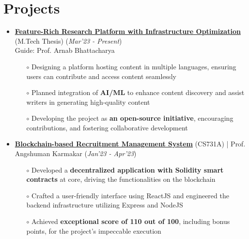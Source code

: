 \documentclass[10.8pt, a4paper]{extarticle}
\newcommand{\shorterSection}[1]{\vspace{-10pt}\section{#1}}
\begin{document}
\shorterSection{Projects}
\vspace{-2pt}
\begin{itemize}
   
  \item \href{~} {\textbf{Feature-Rich Research Platform with Infrastructure Optimization}} (M.Tech Thesis)  \hfill\hfill(\textit{Mar'23 - Present})\\Guide: Prof. Arnab Bhattacharya
  \begin{itemize}
    \item[$\circ$] Designing a platform hosting content in multiple languages, ensuring users can contribute and access content seamlessly\\[-0.6cm]
    \item[$\circ$] Planned integration of \textbf{AI/ML} to enhance content discovery and assist writers in generating high-quality content \\[-0.6cm]
    \item[$\circ$] Developing the project as \textbf{an open-source initiative}, encouraging contributions, and fostering collaborative development \\[-0.6cm]
  \end{itemize}
  \vspace{0.055cm}
  \item \href{https://github.com/vamshimorlawar/Reconchain} {\textbf{Blockchain-based Recruitment Management System}} (CS731A) | Prof. Angshuman Karmakar  \hfill\hfill(\textit{Jan'23 - Apr'23})
  \begin{itemize}
    \item[$\circ$] Developed a \textbf{decentralized application with Solidity smart contracts} at core, driving the functionalities on the blockchain\\[-0.6cm]
    \item[$\circ$] Crafted a user-friendly interface using ReactJS and engineered the backend infrastructure utilizing Express and NodeJS\\[-0.6cm]
    \item[$\circ$] Achieved \textbf{exceptional score of 110 out of 100}, including bonus points, for the project's impeccable execution \\[-0.6cm]
  \end{itemize}

\end{itemize}
\end{document}
